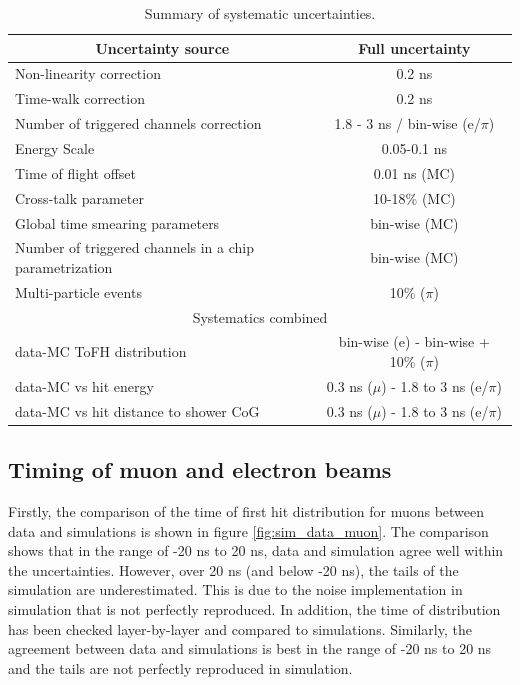 \documentclass{JINST}
\begin{document}
\begin{table}[htb!]
  \centering
  \caption{Summary of systematic uncertainties.}
  \label{table:time_syst}
  \begin{tabular}{@{} lc @{}}
    \toprule
    \multicolumn{1}{c}{Uncertainty source} & Full uncertainty \\
    \midrule
    Non-linearity correction & 0.2 ns \\
    Time-walk correction & 0.2 ns \\
    Number of triggered channels correction & 1.8 - 3 ns / bin-wise (e/$\pi$)\\
    Energy Scale & 0.05-0.1 ns \\
    Time of flight offset & 0.01 ns (MC) \\
    Cross-talk parameter & 10-18\% (MC)\\
    Global time smearing parameters & bin-wise (MC)\\
    Number of triggered channels in a chip parametrization & bin-wise (MC)\\
    Multi-particle events & 10\% ($\pi$) \\
    \midrule
    \midrule
    \multicolumn{2}{c}{Systematics combined} \\
    \midrule
    data-MC ToFH distribution & bin-wise (e) - bin-wise + 10\% ($\pi$) \\
    data-MC vs hit energy & 0.3 ns ($\mu$) - 1.8 to 3 ns (e/$\pi$)\\
    data-MC vs hit distance to shower CoG & 0.3 ns ($\mu$) - 1.8 to 3 ns (e/$\pi$)\\
    \bottomrule
  \end{tabular}
\end{table}

\subsection{Timing of muon and electron beams}

Firstly, the comparison of the time of first hit distribution for muons between data and simulations is shown in figure \ref{fig:sim_data_muon}. The comparison shows that in the range of -20 ns to 20 ns, data and simulation agree well within the uncertainties. However, over 20 ns (and below -20 ns), the tails of the simulation are underestimated. This is due to the noise implementation in simulation that is not perfectly reproduced. In addition, the time of distribution has been checked layer-by-layer and compared to simulations. Similarly, the agreement between data and simulations is best in the range of -20 ns to 20 ns and the tails are not perfectly reproduced in simulation.
\end{document}
